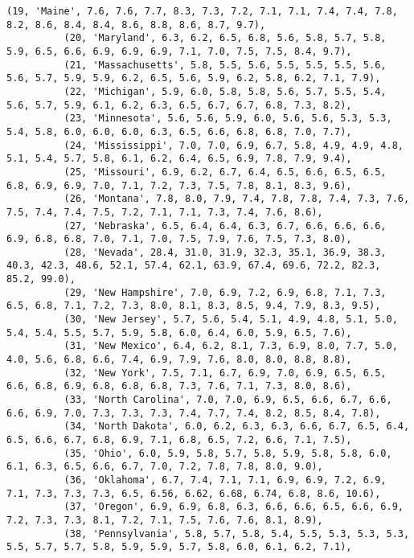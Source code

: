 \documentclass[11pt]{article}
\begin{document}
\begin{Verbatim}[commandchars=\\\{\}]
          (19, 'Maine', 7.6, 7.6, 7.7, 8.3, 7.3, 7.2, 7.1, 7.1, 7.4, 7.4, 7.8, 8.2, 8.6, 8.4, 8.4, 8.6, 8.8, 8.6, 8.7, 9.7),
          (20, 'Maryland', 6.3, 6.2, 6.5, 6.8, 5.6, 5.8, 5.7, 5.8, 5.9, 6.5, 6.6, 6.9, 6.9, 6.9, 7.1, 7.0, 7.5, 7.5, 8.4, 9.7),
          (21, 'Massachusetts', 5.8, 5.5, 5.6, 5.5, 5.5, 5.5, 5.6, 5.6, 5.7, 5.9, 5.9, 6.2, 6.5, 5.6, 5.9, 6.2, 5.8, 6.2, 7.1, 7.9),
          (22, 'Michigan', 5.9, 6.0, 5.8, 5.8, 5.6, 5.7, 5.5, 5.4, 5.6, 5.7, 5.9, 6.1, 6.2, 6.3, 6.5, 6.7, 6.7, 6.8, 7.3, 8.2),
          (23, 'Minnesota', 5.6, 5.6, 5.9, 6.0, 5.6, 5.6, 5.3, 5.3, 5.4, 5.8, 6.0, 6.0, 6.0, 6.3, 6.5, 6.6, 6.8, 6.8, 7.0, 7.7),
          (24, 'Mississippi', 7.0, 7.0, 6.9, 6.7, 5.8, 4.9, 4.9, 4.8, 5.1, 5.4, 5.7, 5.8, 6.1, 6.2, 6.4, 6.5, 6.9, 7.8, 7.9, 9.4),
          (25, 'Missouri', 6.9, 6.2, 6.7, 6.4, 6.5, 6.6, 6.5, 6.5, 6.8, 6.9, 6.9, 7.0, 7.1, 7.2, 7.3, 7.5, 7.8, 8.1, 8.3, 9.6),
          (26, 'Montana', 7.8, 8.0, 7.9, 7.4, 7.8, 7.8, 7.4, 7.3, 7.6, 7.5, 7.4, 7.4, 7.5, 7.2, 7.1, 7.1, 7.3, 7.4, 7.6, 8.6),
          (27, 'Nebraska', 6.5, 6.4, 6.4, 6.3, 6.7, 6.6, 6.6, 6.6, 6.9, 6.8, 6.8, 7.0, 7.1, 7.0, 7.5, 7.9, 7.6, 7.5, 7.3, 8.0),
          (28, 'Nevada', 28.4, 31.0, 31.9, 32.3, 35.1, 36.9, 38.3, 40.3, 42.3, 48.6, 52.1, 57.4, 62.1, 63.9, 67.4, 69.6, 72.2, 82.3, 85.2, 99.0),
          (29, 'New Hampshire', 7.0, 6.9, 7.2, 6.9, 6.8, 7.1, 7.3, 6.5, 6.8, 7.1, 7.2, 7.3, 8.0, 8.1, 8.3, 8.5, 9.4, 7.9, 8.3, 9.5),
          (30, 'New Jersey', 5.7, 5.6, 5.4, 5.1, 4.9, 4.8, 5.1, 5.0, 5.4, 5.4, 5.5, 5.7, 5.9, 5.8, 6.0, 6.4, 6.0, 5.9, 6.5, 7.6),
          (31, 'New Mexico', 6.4, 6.2, 8.1, 7.3, 6.9, 8.0, 7.7, 5.0, 4.0, 5.6, 6.8, 6.6, 7.4, 6.9, 7.9, 7.6, 8.0, 8.0, 8.8, 8.8),
          (32, 'New York', 7.5, 7.1, 6.7, 6.9, 7.0, 6.9, 6.5, 6.5, 6.6, 6.8, 6.9, 6.8, 6.8, 6.8, 7.3, 7.6, 7.1, 7.3, 8.0, 8.6),
          (33, 'North Carolina', 7.0, 7.0, 6.9, 6.5, 6.6, 6.7, 6.6, 6.6, 6.9, 7.0, 7.3, 7.3, 7.3, 7.4, 7.7, 7.4, 8.2, 8.5, 8.4, 7.8),
          (34, 'North Dakota', 6.0, 6.2, 6.3, 6.3, 6.6, 6.7, 6.5, 6.4, 6.5, 6.6, 6.7, 6.8, 6.9, 7.1, 6.8, 6.5, 7.2, 6.6, 7.1, 7.5),
          (35, 'Ohio', 6.0, 5.9, 5.8, 5.7, 5.8, 5.9, 5.8, 5.8, 6.0, 6.1, 6.3, 6.5, 6.6, 6.7, 7.0, 7.2, 7.8, 7.8, 8.0, 9.0),
          (36, 'Oklahoma', 6.7, 7.4, 7.1, 7.1, 6.9, 6.9, 7.2, 6.9, 7.1, 7.3, 7.3, 7.3, 6.5, 6.56, 6.62, 6.68, 6.74, 6.8, 8.6, 10.6),
          (37, 'Oregon', 6.9, 6.9, 6.8, 6.3, 6.6, 6.6, 6.5, 6.6, 6.9, 7.2, 7.3, 7.3, 8.1, 7.2, 7.1, 7.5, 7.6, 7.6, 8.1, 8.9),
          (38, 'Pennsylvania', 5.8, 5.7, 5.8, 5.4, 5.5, 5.3, 5.3, 5.3, 5.5, 5.7, 5.7, 5.8, 5.9, 5.9, 5.7, 5.8, 6.0, 6.1, 6.2, 7.1),

\end{Verbatim}
\end{document}
